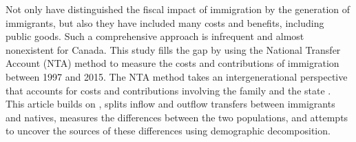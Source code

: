 \vspace{0.7em}\par
Not only have \citet{Lee:1998fs} distinguished the fiscal impact of immigration by the generation of immigrants, but also they have included many costs and benefits, including public goods.
Such a comprehensive approach is infrequent and almost nonexistent for Canada.
This study fills the gap by using the National Transfer Account (NTA) method to measure the costs and contributions of immigration between 1997 and 2015.
The NTA method takes an intergenerational perspective that accounts for costs and contributions involving the family and the state \citep{Mason:2011wc,UnitedNations:2013vz}.
This article builds on \citet{Merette:2019kz}, splits inflow and outflow transfers between immigrants and natives, measures the differences between the two populations, and attempts to uncover the sources of these differences using demographic decomposition.


